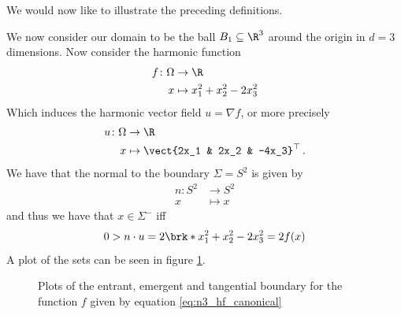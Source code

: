 We would now like to illustrate the preceding definitions.
\begin{example}\label{ex:n3_hvf_canonical}
  We now consider our domain to be the ball $B_1\subseteq\R^3$ around the origin in $d=3$ dimensions.
  Now consider the harmonic function
  \begin{equation}
    \begin{aligned}
    f\colon \Omega&\to\R \\
    x&\mapsto x_1^2+x_2^2-2x_3^2\label{eq:n3_hf_canonical}
    \end{aligned}
  \end{equation}
  Which induces the harmonic vector field $u=\nabla f$, or more precisely
  \begin{equation}
    \begin{aligned}
    u\colon \Omega&\to\R \\
    x&\mapsto \vect{2x_1 & 2x_2 & -4x_3}^\top\,.\label{eq:n3_hvf_canonical}
    \end{aligned}
  \end{equation}
  We have that the normal to the boundary $\Sigma=S^2$ is given by
  \begin{align*}
    n\colon S^2&\to S^2 \\
    x&\mapsto x
  \end{align*}
  and thus we have that $x\in\Sigma^-$ iff 
  \begin{align*}
    0>n\cdot u = 2\brk*{x_1^2+x_2^2-2x_3^2}=2f(x)
  \end{align*}
  A plot of the sets can be seen in figure \ref{pl:n3_hvf_canonical_boundary}.
  \begin{figure}
    \centering
    \missingfigure[figwidth=0.7\textwidth]{}
    \caption{Plots of the entrant, emergent and tangential boundary for the
      function $f$ given by equation \eqref{eq:n3_hf_canonical}}
    \label{pl:n3_hvf_canonical_boundary}
  \end{figure}
\end{example}

